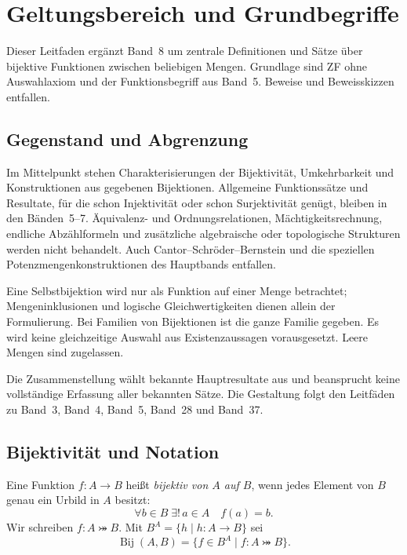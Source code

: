 \chapter{Geltungsbereich und Grundbegriffe}
\label{b08guide:ch:foundations}

Dieser Leitfaden ergänzt Band~8 um zentrale Definitionen und Sätze
über bijektive Funktionen zwischen beliebigen Mengen. Grundlage
sind ZF ohne Auswahlaxiom und der Funktionsbegriff aus Band~5.
Beweise und Beweisskizzen entfallen.

\section{Gegenstand und Abgrenzung}

Im Mittelpunkt stehen Charakterisierungen der Bijektivität,
Umkehrbarkeit und Konstruktionen aus gegebenen Bijektionen.
Allgemeine Funktionssätze und Resultate, für die schon
Injektivität oder schon Surjektivität genügt, bleiben in den
Bänden~5--7. Äquivalenz- und Ordnungsrelationen, Mächtigkeitsrechnung,
endliche Abzählformeln und zusätzliche algebraische oder topologische
Strukturen werden nicht behandelt. Auch Cantor--Schröder--Bernstein
und die speziellen Potenzmengenkonstruktionen des Hauptbands entfallen.

Eine Selbstbijektion wird nur als Funktion auf einer Menge betrachtet;
Mengeninklusionen und logische Gleichwertigkeiten dienen allein der
Formulierung. Bei Familien von Bijektionen ist die ganze Familie
gegeben. Es wird keine gleichzeitige Auswahl aus Existenzaussagen
vorausgesetzt. Leere Mengen sind zugelassen.

Die Zusammenstellung wählt bekannte Hauptresultate aus und
beansprucht keine vollständige Erfassung aller bekannten Sätze.
Die Gestaltung folgt den Leitfäden zu Band~3, Band~4, Band~5,
Band~28 und Band~37.

\section{Bijektivität und Notation}

\begin{definition}
\label{b08guide:def:bijection}
Eine Funktion $f\colon A\to B$ heißt \emph{bijektiv von $A$ auf $B$},
wenn jedes Element von $B$ genau ein Urbild in $A$ besitzt:
\[
 \forall b\in B\;\exists!\,a\in A\quad f(a)=b.
\]
Wir schreiben $f\colon A\bij B$. Mit
$B^A=\{h\mid h\colon A\to B\}$ sei
\[
 \operatorname{Bij}(A,B)
 =\{f\in B^A\mid f\colon A\bij B\}.
\]
\end{definition}

